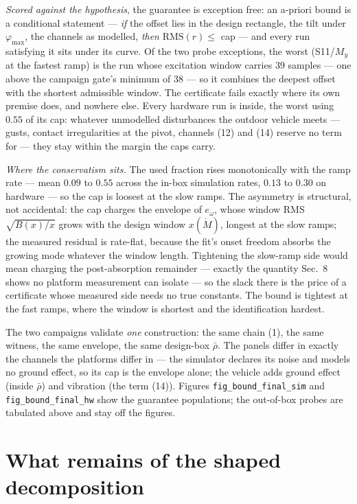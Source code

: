 \documentclass[10pt]{article}
\newcommand{\Mdot}{\dot M}
\newcommand{\rbar}{\bar\rho}
\newcommand{\rms}{\mathrm{RMS}}
\begin{document}
\emph{Scored against the hypothesis}, the guarantee is exception
free: an a-priori bound is a conditional statement --- \emph{if}
the offset lies in the design rectangle, the tilt under
$\varphi_{\max}$, the channels as modelled, \emph{then}
$\rms(r) \le$ cap --- and every run satisfying it sits under its
curve. Of the two probe exceptions, the worst (S11/$M_y$ at the
fastest ramp) is the run whose excitation window carries $39$
samples --- one above the campaign gate's minimum of $38$ --- so it
combines the deepest offset with the shortest admissible window.
The certificate fails exactly where its own premise does, and
nowhere else. Every hardware run is
inside, the worst using $0.55$ of its cap: whatever unmodelled
disturbances the outdoor vehicle meets --- gusts, contact
irregularities at the pivot, channels (12) and (14) reserve no term
for --- they stay within the margin the caps carry.

\emph{Where the conservatism sits.} The used fraction rises
monotonically with the ramp rate --- mean $0.09$ to $0.55$ across
the in-box simulation rates, $0.13$ to $0.30$ on hardware --- so
the cap is loosest at the slow ramps. The asymmetry is structural,
not accidental: the cap charges the envelope of $e_\omega$, whose
window RMS $\sqrt{B(x)/x}$ grows with the design window
$x(\Mdot)$, longest at the slow ramps; the measured residual is
rate-flat, because the fit's onset freedom absorbs the growing
mode whatever the window length. Tightening the slow-ramp side
would mean charging the post-absorption remainder --- exactly the
quantity Sec.~8 shows no platform measurement can isolate --- so
the slack there is the price of a certificate whose measured side
needs no true constants. The bound is tightest at the fast ramps,
where the window is shortest and the identification hardest.

The two campaigns validate \emph{one} construction: the same chain
(1), the same witness, the same envelope, the same design-box
$\rbar$. The panels differ in exactly the channels the platforms
differ in --- the simulator declares its noise and models no ground
effect, so its cap is the envelope alone; the vehicle adds ground
effect (inside $\rbar$) and vibration (the term (14)). Figures
\texttt{fig\_bound\_final\_sim} and \texttt{fig\_bound\_final\_hw}
show the guarantee populations; the out-of-box probes are tabulated
above and stay off the figures.

\section{What remains of the shaped decomposition}
\end{document}
